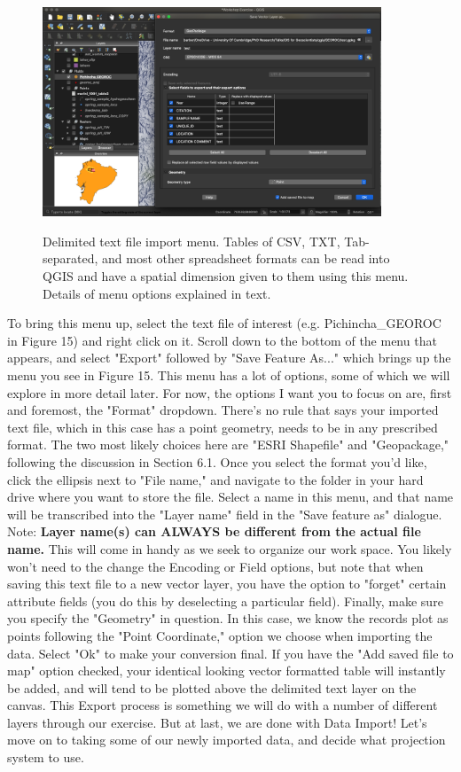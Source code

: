 \documentclass{article}
\begin{document}
\begin{figure}[htbp]
    \centering
    \includegraphics[width=0.9\textwidth]{Fig_15_saving_csv.png}
    \label{fig13}
    \caption{Delimited text file import menu. Tables of CSV, TXT, Tab-separated, and most other spreadsheet formats can be read into QGIS and have a spatial dimension given to them using this menu. Details of menu options explained in text.}
\end{figure}

To bring this menu up, select the text file of interest (e.g. Pichincha\_GEOROC in Figure 15) and right click on it. Scroll down to the bottom of the menu that appears, and select "Export" followed by "Save Feature As..." which brings up the menu you see in Figure 15. This menu has a lot of options, some of which we will explore in more detail later. For now, the options I want you to focus on are, first and foremost, the "Format" dropdown. There's no rule that says your imported text file, which in this case has a point geometry, needs to be in any prescribed format. The two most likely choices here are "ESRI Shapefile" and "Geopackage," following the discussion in Section 6.1. Once you select the format you'd like, click the ellipsis next to "File name," and navigate to the folder in your hard drive where you want to store the file. Select a name in this menu, and that name will be transcribed into the "Layer name" field in the "Save feature as" dialogue. Note: \textbf{Layer name(s) can ALWAYS be different from the actual file name.} This will come in handy as we seek to organize our work space. You likely won't need to the change the Encoding or Field options, but note that when saving this text file to a new vector layer, you have the option to "forget" certain attribute fields (you do this by deselecting a particular field). Finally, make sure you specify the "Geometry" in question. In this case, we know the records plot as points following the "Point Coordinate," option we choose when importing the data. Select "Ok" to make your conversion final. If you have the "Add saved file to map" option checked, your identical looking vector formatted table will instantly be added, and will tend to be plotted above the delimited text layer on the canvas. This Export process is something we will do with a number of different layers through our exercise. But at last, we are done with Data Import! Let's move on to taking some of our newly imported data, and decide what projection system to use. 
\end{document}
